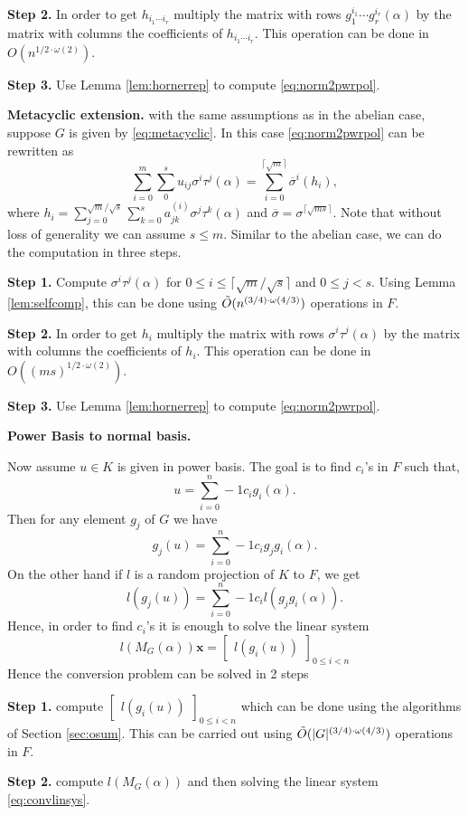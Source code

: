 \textbf{Step 2.} In order to get $h_{i_1 \cdots i_r}$ multiply the matrix with rows $g_1^{i_1} \cdots g_r^{i_r}(\alpha)$ by the
matrix with columns the coefficients of $h_{i_1 \cdots i_r}$. This operation can be done in $O(n^{1/2 \cdot \omega(2)})$.

\textbf{Step 3.} Use Lemma \ref{lem:hornerrep} to compute \eqref{eq:norm2pwrpol}. 

\textbf{Metacyclic extension.} with the same assumptions as in the abelian case, suppose $G$ is given by \eqref{eq:metacyclic}. In
this case \eqref{eq:norm2pwrpol} can be rewritten as
$$\sum_{i = 0}^m \sum_{0}^s u_{ij}\sigma^i \tau^j(\alpha) = \sum_{i = 0}^{\lceil \sqrt{m} \rceil} \overline{\sigma}^i(h_i),$$
where $h_i = \sum_{j = 0}^{\sqrt{m}/\sqrt{s}}\sum_{k =0}^{s} a_{jk}^{(i)}\sigma^j \tau^k (\alpha)$ and 
$\overline{\sigma} = \sigma^{\lceil \sqrt{ms} \rceil}$.
Note that without loss of generality we can assume $s \leq m$. Similar to the abelian case, we can do the computation in three steps.

\textbf{Step 1.} Compute $\sigma^i\tau^j(\alpha)$ for $0 \leq i \leq \lceil \sqrt{m} /\sqrt{s} \rceil$ and $0 \leq j < s$.
Using Lemma \ref{lem:selfcomp}, this can be done using $\tilde{O}(n^{(3/4)\cdot \omega(4/3)})$ operations in $F$.

\textbf{Step 2.} In order to get $h_{i}$ multiply the matrix with rows $\sigma^i\tau^j(\alpha)$ by the
matrix with columns the coefficients of $h_{i}$. This operation can be done in $O((ms)^{1/2 \cdot \omega(2)})$.

\textbf{Step 3.} Use Lemma \ref{lem:hornerrep} to compute \eqref{eq:norm2pwrpol}. 

\textbf{Power Basis to normal basis.}

Now assume $u \in K$ is given in power basis. The goal is to find $c_i$'s in $F$ such that, 
$$u = \sum_{i = 0}^n-1 c_i g_i(\alpha).$$
Then for any element $g_j$ of $G$ we have
$$g_j(u) = \sum_{i = 0}^n-1 c_i g_jg_i(\alpha).$$
On the other hand if $l$ is a random projection of $K$ to $F$, we get 
$$l(g_j(u)) = \sum_{i = 0}^n-1 c_i l(g_jg_i(\alpha)).$$
Hence, in order to find $c_i$'s it is enough to solve the linear system
\begin{equation}\label{eq:convlinsys}
l(M_G(\alpha)) \textbf{x} = \begin{bmatrix} l(g_i(u)) \end{bmatrix}_{0 \leq i <n}
\end{equation}
Hence the conversion problem can be solved in 2 steps 

\textbf{Step 1.} compute $\begin{bmatrix} l(g_i(u)) \end{bmatrix}_{0 \leq i <n}$ which can be done using
the algorithms of Section \ref{sec:osum}. This can be carried out using $\tilde{O}(\vert G \vert ^{(3/4)\cdot \omega(4/3)})$ operations in $F$.

\textbf{Step 2.} compute $l(M_G(\alpha))$ and then solving the linear system \eqref{eq:convlinsys}.
